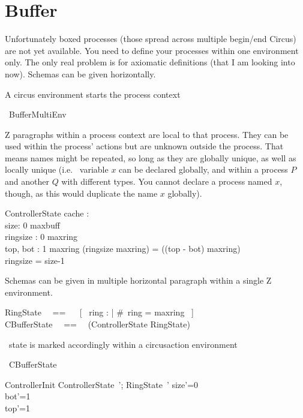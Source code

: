 \documentclass{article}
\begin{document}
\section{Buffer}

Unfortunately boxed processes (those spread across multiple
begin/end Circus) are not yet available. You need to define your
processes within one environment only. The only real problem is for
axiomatic definitions (that I am looking into now). Schemas can be
given horizontally.

A \textsf{circus} environment starts the process context
%
\begin{circus}
    \circprocess\ BufferMultiEnv \circdef \circbegin
\end{circus}

Z paragraphs within a process context are local to that process. They can be used
within the process' actions but are unknown outside the process. That means names
might be repeated, so long as they are globally unique, as well as locally unique
(i.e.~ variable $x$ can be declared globally, and within a process $P$ and another $Q$
with different types. You cannot declare a process named $x$, though, as this would
duplicate the name $x$ globally).
%
\begin{schema}{ControllerState}
    cache : \nat
\\%
   size: 0 \upto maxbuff
    \\%
    ringsize : 0 \upto maxring
    \\%
    top, bot : 1 \upto maxring
\where
        (ringsize \mod maxring) = ((top - bot) \mod maxring)
        \\%
        ringsize = size-1
\end{schema}

Schemas  can be given in multiple horizontal paragraph within a single Z environment.
\begin{zed}
    RingState ~~== ~~ [~ ring : \seq \nat | \#~ring = maxring ~] \\
    CBufferState ~~==~~ (ControllerState \lor RingState)
\end{zed}

\Circus\ state is marked accordingly within a \textsf{circusaction} environment
\begin{circusaction}
    \circstate\  CBufferState
\end{circusaction}

\begin{schema}{ControllerInit}
    ControllerState~'; RingState~'
\where
    size'=0 \\
    bot'=1 \\
    top'=1
\end{schema}
\end{document}
